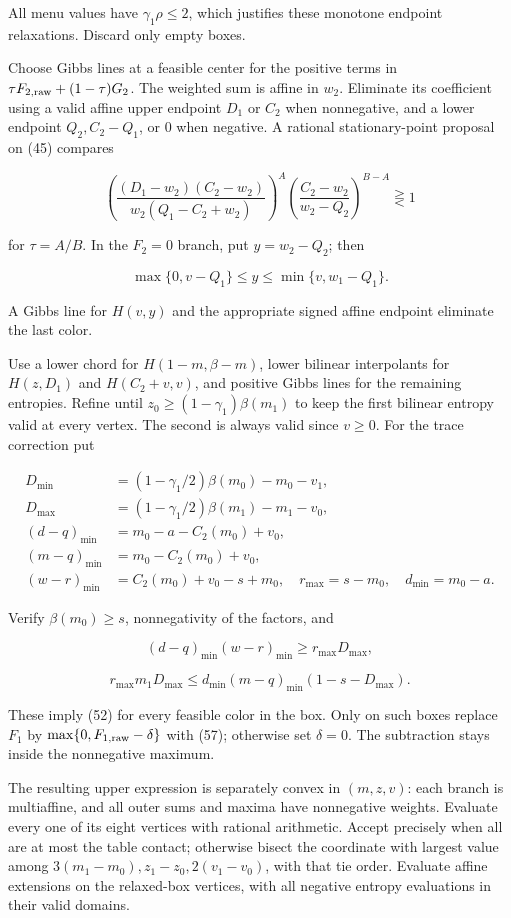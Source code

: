 All menu values have \(\gamma_1\rho\le2\), which justifies these monotone endpoint relaxations. Discard only empty boxes.

Choose Gibbs lines at a feasible center for the positive terms in \(\tau F_{2,\rm raw}+(1-\tau)G_2\). The weighted sum is affine in \(w_2\). Eliminate its coefficient using a valid affine upper endpoint \(D_1\) or \(C_2\) when nonnegative, and a lower endpoint \(Q_2,C_2-Q_1\), or \(0\) when negative. A rational stationary-point proposal on (45) compares

\[
\left(\frac{(D_1-w_2)(C_2-w_2)}{w_2(Q_1-C_2+w_2)}\right)^A
\left(\frac{C_2-w_2}{w_2-Q_2}\right)^{B-A}
\gtreqless1
\tag{119}
\]

for \(\tau=A/B\). In the \(F_2=0\) branch, put \(y=w_2-Q_2\); then

\[
\max\{0,v-Q_1\}\le y\le\min\{v,w_1-Q_1\}.
\]

A Gibbs line for \(H(v,y)\) and the appropriate signed affine endpoint eliminate the last color.

Use a lower chord for \(H(1-m,\beta-m)\), lower bilinear interpolants for \(H(z,D_1)\) and \(H(C_2+v,v)\), and positive Gibbs lines for the remaining entropies. Refine until \(z_0\ge(1-\gamma_1)\beta(m_1)\) to keep the first bilinear entropy valid at every vertex. The second is always valid since \(v\ge0\). For the trace correction put

\[
\begin{aligned}
D_{\min}&=(1-\gamma_1/2)\beta(m_0)-m_0-v_1,\\
D_{\max}&=(1-\gamma_1/2)\beta(m_1)-m_1-v_0,\\
(d-q)_{\min}&=m_0-a-C_2(m_0)+v_0,\\
(m-q)_{\min}&=m_0-C_2(m_0)+v_0,\\
(w-r)_{\min}&=C_2(m_0)+v_0-s+m_0,\quad
r_{\max}=s-m_0,\quad d_{\min}=m_0-a.
\end{aligned}
\tag{120}
\]

Verify \(\beta(m_0)\ge s\), nonnegativity of the factors, and

\[
(d-q)_{\min}(w-r)_{\min}\ge r_{\max}D_{\max},
\]

\[
r_{\max}m_1D_{\max}\le
 d_{\min}(m-q)_{\min}(1-s-D_{\max}).
\tag{121}
\]

These imply (52) for every feasible color in the box. Only on such boxes replace \(F_1\) by \(\max\{0,F_{1,\rm raw}-\delta\}\) with (57); otherwise set \(\delta=0\). The subtraction stays inside the nonnegative maximum.

The resulting upper expression is separately convex in \((m,z,v)\): each branch is multiaffine, and all outer sums and maxima have nonnegative weights. Evaluate every one of its eight vertices with rational arithmetic. Accept precisely when all are at most the table contact; otherwise bisect the coordinate with largest value among \(3(m_1-m_0),z_1-z_0,2(v_1-v_0)\), with that tie order. Evaluate affine extensions on the relaxed-box vertices, with all negative entropy evaluations in their valid domains.

